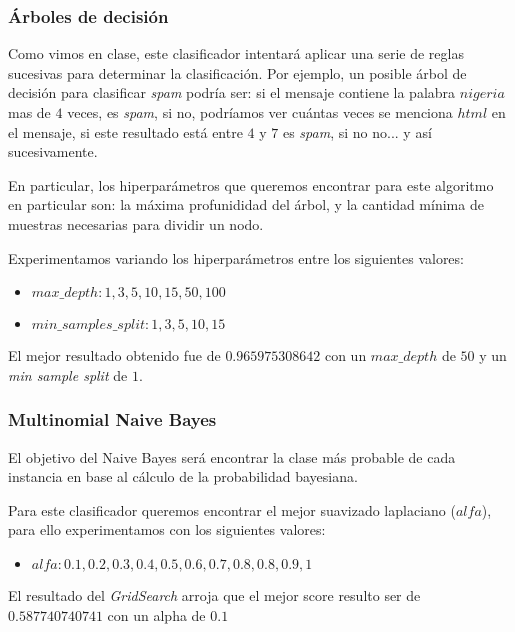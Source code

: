 \subsubsection{Árboles de decisión}

Como vimos en clase, este clasificador intentará aplicar una serie de reglas sucesivas para determinar la clasificación. Por ejemplo, un posible árbol de decisión para clasificar \textit{spam} podría ser: si el mensaje contiene la palabra $nigeria$ mas de $4$ veces, es \textit{spam}, si no, podríamos ver cuántas veces se menciona $html$ en el mensaje, si este resultado está entre $4$ y $7$ es \textit{spam}, si no no... y así sucesivamente.

En particular, los hiperparámetros que queremos encontrar para este algoritmo en particular son: la máxima profunididad del árbol, y la cantidad mínima de muestras necesarias para dividir un nodo.

Experimentamos variando los hiperparámetros entre los siguientes valores:

\begin{itemize}
\item $max\_depth: 1,3,5,10,15,50,100$ 
\item $min\_samples\_split: 1,3,5,10,15$
\end{itemize}

El mejor resultado obtenido fue de $0.965975308642$ con un $max\_depth$ de $50$ y un \textit{min sample split} de $1$.



\subsubsection{Multinomial Naive Bayes}

El objetivo del Naive Bayes será encontrar la clase más probable de cada instancia en base al cálculo de la probabilidad bayesiana. 

Para este clasificador queremos encontrar el mejor suavizado laplaciano ($alfa$), para ello experimentamos con los siguientes valores:
\begin{itemize}
\item $alfa: 0.1,0.2,0.3,0.4,0.5,0.6,0.7,0.8,0.8,0.9,1$
\end{itemize}

El resultado del \textit{GridSearch} arroja que el mejor score resulto ser de $0.587740740741$ con un alpha de $0.1$

